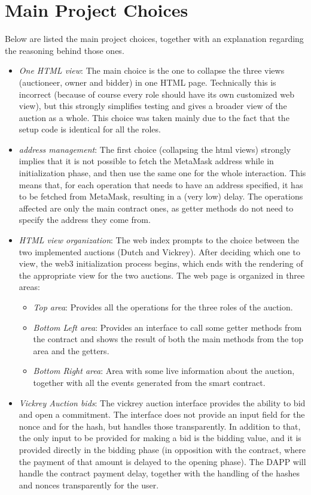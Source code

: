 \documentclass[11pt, a4paper]{report}
\begin{document}
\section*{Main Project Choices}
Below are listed the main project choices, together with an explanation regarding the reasoning behind those ones.
\begin{itemize}
	\item \emph{One HTML view}: The main choice is the one to collapse the three views (auctioneer, owner and bidder) in one HTML page. Technically this is incorrect (because of course every role should have its own customized web view), but this strongly simplifies testing and gives a broader view of the auction as a whole. This choice was taken mainly due to the fact that the setup code is identical for all the roles.
	\item \emph{address management}: The first choice (collapsing the html views) strongly implies that it is not possible to fetch the MetaMask address while in initialization phase, and then use the same one for the whole interaction. This means that, for each operation that needs to have an address specified, it has to be fetched from MetaMask, resulting in a (very low) delay. The operations affected are only the main contract ones, as getter methods do not need to specify the address they come from. 
	\item \emph{HTML view organization}: The web index prompts to the choice between the two implemented auctions (Dutch and Vickrey). After deciding which one to view, the web3 initialization process begins, which ends with the rendering of the appropriate view for the two auctions. The web page is organized in three areas:
	\begin{itemize}
		\item \emph{Top area}: Provides all the operations for the three roles of the auction.
		\item \emph{Bottom Left area}: Provides an interface to call some getter methods from the contract and shows the result of both the main methods from the top area and the getters.
		\item \emph{Bottom Right area}: Area with some live information about the auction, together with all the events generated from the smart contract.
	\end{itemize}
	\item \emph{Vickrey Auction bids}: The vickrey auction interface provides the ability to bid and open a commitment. The interface does not provide an input field for the nonce and for the hash, but handles those transparently. In addition to that, the only input to be provided for making a bid is the bidding value, and it is provided directly in the bidding phase (in opposition with the contract, where the payment of that amount is delayed to the opening phase). The DAPP will handle the contract payment delay, together with the handling of the hashes and nonces transparently for the user.
\end{itemize}
	
\end{document}
